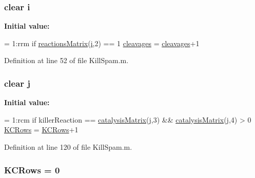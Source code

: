 \hypertarget{a00029_ac870e1cd47f6d78f16a98a24c8392fcf}{
\subsubsection[{i}]{ clear i}}\label{a00029_ac870e1cd47f6d78f16a98a24c8392fcf}
{\bfseries Initial value\-:}
\begin{DoxyCode}
= 1:rrm
        \textcolor{keywordflow}{if} \hyperlink{a00027_ac52097a2745fcef31eb175d2e9485845}{reactionsMatrix}(\hyperlink{a00027_a1de1a45bc56b002aa1ad94bb5f54a1ca}{i},2) == 1
            \hyperlink{a00027_a89060c6979e5a4ff7b0985b35f295695}{cleavages} = \hyperlink{a00027_a89060c6979e5a4ff7b0985b35f295695}{cleavages}+1
\end{DoxyCode}


Definition at line 52 of file Kill\-Spam.\-m.

\hypertarget{a00029_ad34e9c7e9ae69ae0b9f1866faed5e4ad}{
\subsubsection[{j}]{\setlength{\rightskip}{0pt plus 5cm}clear j}}\label{a00029_ad34e9c7e9ae69ae0b9f1866faed5e4ad}
{\bfseries Initial value\-:}
\begin{DoxyCode}
= 1:rcm
                \textcolor{keywordflow}{if} killerReaction == \hyperlink{a00027_a0810027f58d6be965e44b7b84c44ace8}{catalysisMatrix}(\hyperlink{a00028_ad34e9c7e9ae69ae0b9f1866faed5e4ad}{j},3) && 
      \hyperlink{a00027_a0810027f58d6be965e44b7b84c44ace8}{catalysisMatrix}(\hyperlink{a00028_ad34e9c7e9ae69ae0b9f1866faed5e4ad}{j},4) > 0
                    \hyperlink{a00029_a62227634d3ceda9bf932c630583da2b9}{KCRows} = \hyperlink{a00029_a62227634d3ceda9bf932c630583da2b9}{KCRows}+1
\end{DoxyCode}


Definition at line 120 of file Kill\-Spam.\-m.

\hypertarget{a00029_a62227634d3ceda9bf932c630583da2b9}{
\subsubsection[{K\-C\-Rows}]{\setlength{\rightskip}{0pt plus 5cm}K\-C\-Rows = 0}}\label{a00029_a62227634d3ceda9bf932c630583da2b9}



